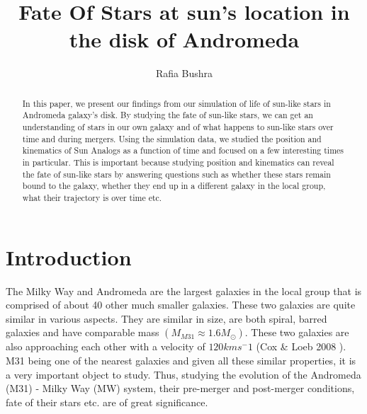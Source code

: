 \documentclass[iop]{emulateapj}
\begin{document}
\title{Fate Of Stars at sun's location in the disk of Andromeda}

\author{Rafia Bushra}

\begin{abstract}
    
    In this paper, we present our findings from our simulation of life of sun-like stars in Andromeda galaxy's disk. By studying the fate of sun-like stars, we can get an understanding of stars in our own galaxy and of what happens to sun-like stars over time and during mergers. Using the simulation data, we studied the position and kinematics of Sun Analogs as a function of time and focused on a few interesting times in particular. This is important because studying position and kinematics can reveal the fate of sun-like stars by answering questions such as whether these stars remain bound to the galaxy, whether they end up in a different galaxy in the local group, what their trajectory is over time etc.      
\end{abstract}

\section{Introduction}

    The Milky Way and Andromeda are the largest galaxies in the local group that is comprised of about 40 other much smaller galaxies. These two galaxies are quite similar in various aspects. They are similar in size, are both spiral, barred galaxies and have comparable mass $(M_{M31}\approx 1.6M_\odot)$. These two galaxies are also approaching each other with a velocity of $120kms^-1$ (Cox \& Loeb 2008 \cite{cl08}). M31 being one of the nearest galaxies and given all these similar properties, it is a very important object to study. Thus, studying the evolution of the Andromeda (M31) - Milky Way (MW) system, their pre-merger and post-merger conditions, fate of their stars etc. are of great significance. \medskip
    
\end{document}
